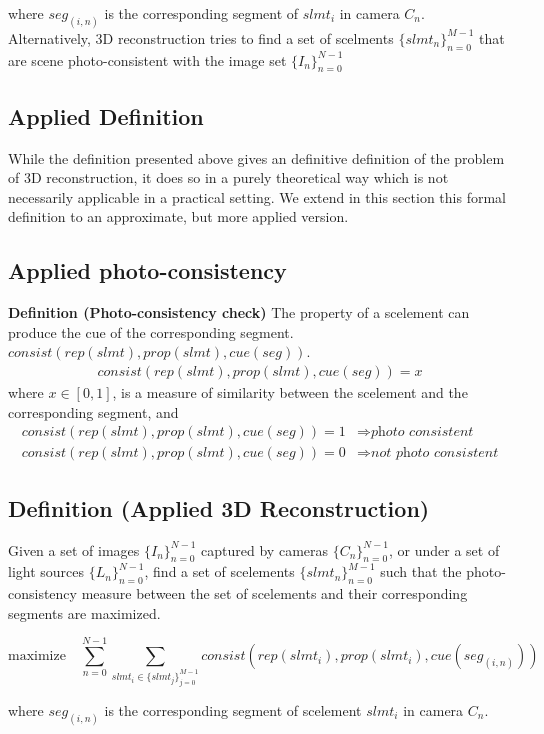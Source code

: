 where $seg_{(i, n)}$ is the corresponding segment of $slmt_i$ in camera $C_n$. Alternatively, 3D reconstruction tries to find a set of scelments $\{slmt_n\}_{n=0}^{M-1}$ that are scene photo-consistent with the image set $\{I_n\}_{n=0}^{N-1}$

\subsection{Applied Definition}
While the definition presented above gives an definitive definition of the problem of 3D reconstruction, it does so in a purely theoretical way which is not necessarily applicable in a practical setting. We extend in this section this formal definition to an approximate, but more applied version.

\subsection{Applied photo-consistency}
\textbf{Definition (Photo-consistency check)} The property of a scelement can produce the cue of the corresponding segment. $consist(rep(slmt), prop(slmt), cue(seg))$.
\begin{align*}
consist(rep(slmt), prop(slmt), cue(seg)) = x
\end{align*}
where $x\in[0, 1]$, is a measure of similarity between the scelement and the corresponding segment, and
\begin{align*}
consist(rep(slmt), prop(slmt), cue(seg)) = 1 &\Rightarrow \textit{photo consistent}\\
consist(rep(slmt), prop(slmt), cue(seg)) = 0 &\Rightarrow \textit{not photo consistent}
\end{align*}

\subsection{Definition (Applied 3D Reconstruction)} Given a set of images $\{I_n\}_{n=0}^{N-1}$ captured by cameras $\{C_n\}_{n=0}^{N-1}$, or under a set of light sources $\{L_n\}_{n=0}^{N-1}$, find a set of scelements $\{slmt_n\}_{n=0}^{M-1}$ such that the photo-consistency measure between the set of scelements and their corresponding segments are maximized.

$$\mbox{maximize} \quad \sum_{n=0}^{N-1}\sum_{slmt_i\in \{slmt_j\}_{j=0}^{M-1}} consist(rep(slmt_i), prop(slmt_i), cue(seg_{(i, n)}))$$

where $seg_{(i, n)}$ is the corresponding segment of scelement $slmt_i$ in camera $C_n$.

